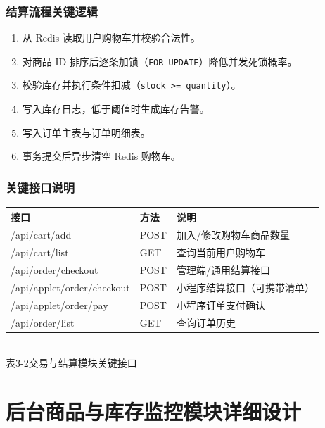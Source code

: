 \subsubsection{结算流程关键逻辑}
\begin{enumerate}[leftmargin=2em]
  \item 从 Redis 读取用户购物车并校验合法性。
  \item 对商品 ID 排序后逐条加锁（\texttt{FOR UPDATE}）降低并发死锁概率。
  \item 校验库存并执行条件扣减（\texttt{stock >= quantity}）。
  \item 写入库存日志，低于阈值时生成库存告警。
  \item 写入订单主表与订单明细表。
  \item 事务提交后异步清空 Redis 购物车。
\end{enumerate}

\subsubsection{关键接口说明}
\begin{center}
  \renewcommand{\arraystretch}{1.35}
  \begin{tabular}{|>{\centering\arraybackslash}m{3.6cm}|>{\centering\arraybackslash}m{2.2cm}|>{\centering\arraybackslash}m{6.4cm}|}
    \hline
    \textbf{接口} & \textbf{方法} & \textbf{说明} \\ \hline
    /api/cart/add & POST & 加入/修改购物车商品数量 \\ \hline
    /api/cart/list & GET & 查询当前用户购物车 \\ \hline
    /api/order/checkout & POST & 管理端/通用结算接口 \\ \hline
    /api/applet/order/checkout & POST & 小程序结算接口（可携带清单） \\ \hline
    /api/applet/order/pay & POST & 小程序订单支付确认 \\ \hline
    /api/order/list & GET & 查询订单历史 \\ \hline
  \end{tabular}
  \\[0.3em]
  {表3-2\quad 交易与结算模块关键接口}
\end{center}

\section{后台商品与库存监控模块详细设计}

